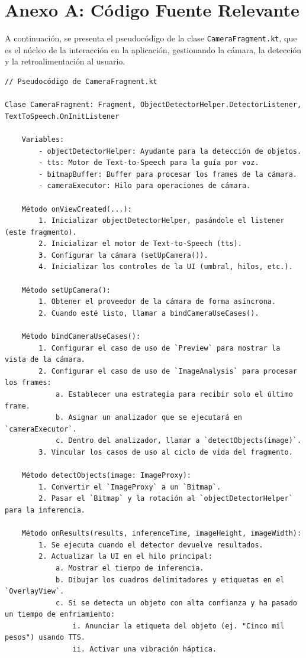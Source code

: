 \documentclass[10pt,a4paper]{report}
\begin{document}
\appendix
\chapter{Anexo A: Código Fuente Relevante}
A continuación, se presenta el pseudocódigo de la clase \texttt{CameraFragment.kt}, que es el núcleo de la interacción en la aplicación, gestionando la cámara, la detección y la retroalimentación al usuario.

\begin{verbatim}
// Pseudocódigo de CameraFragment.kt

Clase CameraFragment: Fragment, ObjectDetectorHelper.DetectorListener, TextToSpeech.OnInitListener

    Variables:
        - objectDetectorHelper: Ayudante para la detección de objetos.
        - tts: Motor de Text-to-Speech para la guía por voz.
        - bitmapBuffer: Buffer para procesar los frames de la cámara.
        - cameraExecutor: Hilo para operaciones de cámara.

    Método onViewCreated(...):
        1. Inicializar objectDetectorHelper, pasándole el listener (este fragmento).
        2. Inicializar el motor de Text-to-Speech (tts).
        3. Configurar la cámara (setUpCamera()).
        4. Inicializar los controles de la UI (umbral, hilos, etc.).

    Método setUpCamera():
        1. Obtener el proveedor de la cámara de forma asíncrona.
        2. Cuando esté listo, llamar a bindCameraUseCases().

    Método bindCameraUseCases():
        1. Configurar el caso de uso de `Preview` para mostrar la vista de la cámara.
        2. Configurar el caso de uso de `ImageAnalysis` para procesar los frames:
            a. Establecer una estrategia para recibir solo el último frame.
            b. Asignar un analizador que se ejecutará en `cameraExecutor`.
            c. Dentro del analizador, llamar a `detectObjects(image)`.
        3. Vincular los casos de uso al ciclo de vida del fragmento.

    Método detectObjects(image: ImageProxy):
        1. Convertir el `ImageProxy` a un `Bitmap`.
        2. Pasar el `Bitmap` y la rotación al `objectDetectorHelper` para la inferencia.

    Método onResults(results, inferenceTime, imageHeight, imageWidth):
        1. Se ejecuta cuando el detector devuelve resultados.
        2. Actualizar la UI en el hilo principal:
            a. Mostrar el tiempo de inferencia.
            b. Dibujar los cuadros delimitadores y etiquetas en el `OverlayView`.
            c. Si se detecta un objeto con alta confianza y ha pasado un tiempo de enfriamiento:
                i. Anunciar la etiqueta del objeto (ej. "Cinco mil pesos") usando TTS.
                ii. Activar una vibración háptica.


\end{verbatim}
\end{document}

